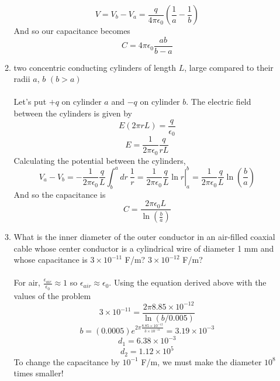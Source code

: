 \documentclass[11pt,letterpaper]{article}
\begin{document}
\begin{enumerate}
\begin{enumerate}
$$V = V_b-V_a = \frac{q}{4\pi\epsilon_0}\left(\frac{1}{a}-\frac{1}{b}\right)$$
And so our capacitance becomes
$$C = 4\pi\epsilon_0\frac{ab}{b-a}$$
\item two concentric conducting cylinders of length $L$, large compared to their radii $a$, $b$ $(b>a)$
\\ \\Let's put $+q$ on cylinder $a$ and $-q$ on cylinder $b$. The electric field between the cylinders is given by
$$E(2\pi r L) = \frac{q}{\epsilon_0}$$
$$E = \frac{1}{2\pi\epsilon_0}\frac{q}{rL}$$
Calculating the potential between the cylinders,
$$V_a-V_b = -\frac{1}{2\pi\epsilon_0}\frac{q}{L}\int_{b}^{a}{dr\ \frac{1}{r}}=\frac{1}{2\pi\epsilon_0}\left.\frac{q}{L}\ln{r}\right|_a^b = \frac{1}{2\pi\epsilon_0}\frac{q}{L}\ln{\left(\frac{b}{a}\right)}$$
And so the capacitance is
$$C = \frac{2\pi\epsilon_0L}{\ln{\left(\frac{b}{a}\right)}}$$
\item What is the inner diameter of the outer conductor in an air-filled coaxial cable whose center conductor is a cylindrical wire of diameter 1 mm and whose capacitance is $3\times 10^{-11}$ F/m? $3\times 10^{-12}$ F/m?
\\ \\For air, $\frac{\epsilon_{air}}{\epsilon_0}\approx1$ so $\epsilon_{air}\approx\epsilon_0$. Using the equation derived above with the values of the problem
$$3\times10^{-11} = \frac{2\pi8.85\times10^{-12}}{\ln{(b/0.005)}}$$
$$b =(0.0005) e^{2\pi\frac{8.85\times 10^{-12}}{3\times10^{-11}}}=3.19\times10^{-3}$$
$$d_1= 6.38\times10^{-3}$$
$$d_2 = 1.12\times10^5$$
To change the capacitance by $10^{-1}$ F/m, we must make the diameter $10^8$ times smaller!
\end{enumerate}

\end{enumerate}
\end{document}
